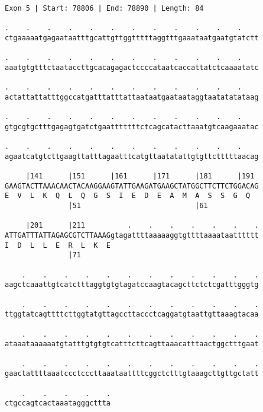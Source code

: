 \documentclass{article}
\begin{document}
\newpage
\begin{Verbatim}
Exon 5 | Start: 78806 | End: 78890 | Length: 84
 
.    .    .    .    .    .    .    .    .    .    .    .    
ctgaaaaatgagaataatttgcattgttggtttttaggtttgaaataatgaatgtatctt
  
.    .    .    .    .    .    .    .    .    .    .    .    
aaatgtgtttctaataccttgcacagagactccccataatcaccattatctcaaaatatc
  
.    .    .    .    .    .    .    .    .    .    .    .    
actattattatttggccatgatttatttattaataatgaataataggtaatatatataag
  
.    .    .    .    .    .    .    .    .    .    .    .    
gtgcgtgctttgagagtgatctgaatttttttctcagcatacttaaatgtcaagaaatac
  
.    .    .    .    .    .    .    .    .    .    .    .    
agaatcatgtcttgaagttatttagaatttcatgttaatatattgtgttctttttaacag
  
     |141      |151      |161      |171      |181      |191 
GAAGTACTTAAACAACTACAAGGAAGTATTGAAGATGAAGCTATGGCTTCTTCTGGACAG
E  V  L  K  Q  L  Q  G  S  I  E  D  E  A  M  A  S  S  G  Q  
               |51                           |61            
  
     |201      |211          .    .    .    .    .    .    .
ATTGATTTATTAGAGCGTCTTAAAGgtagattttaaaaaggtgttttaaaataatttttt
I  D  L  L  E  R  L  K  E                                   
               |71                                          
  
    .    .    .    .    .    .    .    .    .    .    .    .
aagctcaaattgtcatctttaggtgtgtagatccaagtacagcttctctcgatttgggtg
  
    .    .    .    .    .    .    .    .    .    .    .    .
ttggtatcagttttcttggtatgttagccttaccctcaggatgtaattgttaaagtacaa
  
    .    .    .    .    .    .    .    .    .    .    .    .
ataaataaaaaatgtatttgtgtgtcatttcttcagttaaacatttaactggctttgaat
  
    .    .    .    .    .    .    .    .    .    .    .    .
gaactattttaaatccctcccttaaataattttcggctctttgtaaagcttgttgctatt
  
    .    .    .    .    .
ctgccagtcactaaatagggcttta
\end{Verbatim}
\newpage
\end{document}
